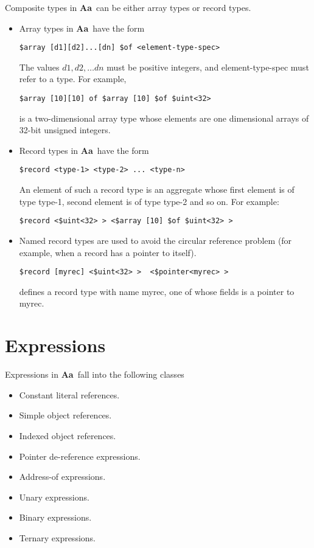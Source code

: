 \documentclass{article}
\newcommand{\Aa}{{\bf Aa}~}
\begin{document}
Composite types in \Aa can be either
array types or record types.
\begin{itemize}
\item 
Array types in \Aa have the form
\begin{verbatim}
$array [d1][d2]...[dn] $of <element-type-spec>
\end{verbatim} %
The values $ d1,d2, \ldots dn$ must
be positive integers, and element-type-spec
must refer to a type.
For example, 
\begin{verbatim}
$array [10][10] of $array [10] $of $uint<32>
\end{verbatim}
is a two-dimensional array type whose
elements are one dimensional arrays of 32-bit
unsigned integers.
\item
Record types in \Aa have the form
\begin{verbatim}
$record <type-1> <type-2> ... <type-n>
\end{verbatim}
An element of such a record type is
an aggregate whose first element is of type
type-1, second element is of type type-2 and so on.
For example:
\begin{verbatim}
$record <$uint<32> > <$array [10] $of $uint<32> > 
\end{verbatim}
\item Named record types are used to avoid the circular
reference problem (for example, when a record has a pointer to
itself).
\begin{verbatim}
$record [myrec] <$uint<32> >  <$pointer<myrec> >
\end{verbatim}
defines a record type with name myrec, one of whose
fields is a pointer to myrec.
\end{itemize}



\section{Expressions} \label{sec:Expressions}


Expressions in \Aa fall into the following classes
\begin{itemize}
\item Constant literal references.
\item Simple object references.
\item Indexed object references.
\item Pointer de-reference expressions.
\item Address-of expressions.
\item Unary expressions.
\item Binary expressions.
\item Ternary expressions.
\end{itemize}
\end{document}

